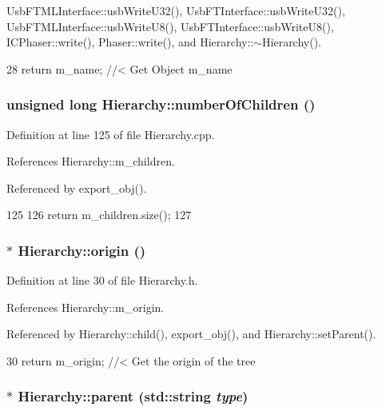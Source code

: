 UsbFTMLInterface::usbWriteU32(), UsbFTInterface::usbWriteU32(), UsbFTMLInterface::usbWriteU8(), UsbFTInterface::usbWriteU8(), ICPhaser::write(), Phaser::write(), and Hierarchy::$\sim$Hierarchy().


\begin{DoxyCode}
28 { return m_name; } //< Get Object m_name
\end{DoxyCode}
\hypertarget{classHierarchy_ab16e84de65fd84e14001a6cf941c8be4}{
\subsubsection[{numberOfChildren}]{\setlength{\rightskip}{0pt plus 5cm}unsigned long Hierarchy::numberOfChildren ()}}
\label{classHierarchy_ab16e84de65fd84e14001a6cf941c8be4}


Definition at line 125 of file Hierarchy.cpp.

References Hierarchy::m\_\-children.

Referenced by export\_\-obj().


\begin{DoxyCode}
125                                            {
126   return m_children.size();
127 }
\end{DoxyCode}
\hypertarget{classHierarchy_aee461dc930ce3871636ff87f075b1b83}{
\subsubsection[{origin}]{$\ast$ Hierarchy::origin ()}}
\label{classHierarchy_aee461dc930ce3871636ff87f075b1b83}


Definition at line 30 of file Hierarchy.h.

References Hierarchy::m\_\-origin.

Referenced by Hierarchy::child(), export\_\-obj(), and Hierarchy::setParent().


\begin{DoxyCode}
30 { return m_origin; }  //< Get the origin of the tree
\end{DoxyCode}
\hypertarget{classHierarchy_ad550588733bf75ac5c0fcfd7c8fd11a6}{
\subsubsection[{parent}]{ $\ast$ Hierarchy::parent (std::string {\em type})}}
\label{classHierarchy_ad550588733bf75ac5c0fcfd7c8fd11a6}


